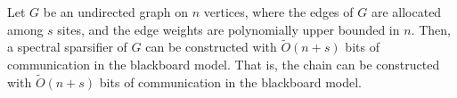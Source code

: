
\begin{thm}\label{thm:gcblackboard}
Let $G$ be an undirected graph on $n$ vertices, where the edges of $G$ are allocated among $s$ sites, and the edge weights are polynomially upper bounded in $n$. Then, a spectral sparsifier of $G$ can be constructed with $\tilde{O}(n+s)$ bits of communication in the blackboard model. That is, the chain  can be constructed with $\tilde{O}(n+s)$ bits of communication in the blackboard model.
\end{thm}



